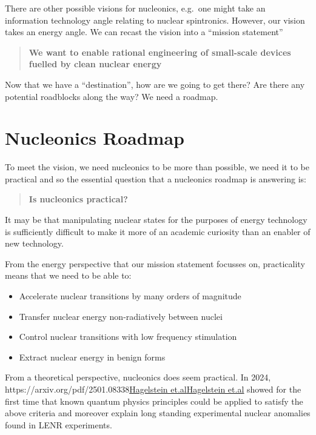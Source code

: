 \documentclass[
]{article}
\let\oldhref\href
\renewcommand{\href}[2]{\ifx#1\urlprefix\oldhref{#1}{#2}\else\uline{\oldhref{#1}{#2}}\fi}
\renewcommand{\[}{\begin{equation}}
\renewcommand{\]}{\end{equation}}
\providecommand{\tightlist}{%
  \setlength{\itemsep}{0pt}\setlength{\parskip}{0pt}}
\begin{document}
There are other possible visions for nucleonics, e.g.~one might take an
information technology angle relating to nuclear spintronics. However,
our vision takes an energy angle. We can recast the vision into a
``mission statement''

\begin{quote}
\textbf{We want to enable rational engineering of small-scale devices
fuelled by clean nuclear energy}
\end{quote}

Now that we have a ``destination'', how are we going to get there? Are
there any potential roadblocks along the way? We need a roadmap.

\section{Nucleonics Roadmap}\label{nucleonics-roadmap}

To meet the vision, we need nucleonics to be more than possible, we need
it to be practical and so the essential question that a nucleonics
roadmap is answering is:

\begin{quote}
\textbf{Is nucleonics practical?}
\end{quote}

It may be that manipulating nuclear states for the purposes of energy
technology is sufficiently difficult to make it more of an academic
curiosity than an enabler of new technology.

From the energy perspective that our mission statement focusses on,
practicality means that we need to be able to:

\begin{itemize}
\tightlist
\item
  Accelerate nuclear transitions by many orders of magnitude
\item
  Transfer nuclear energy non-radiatively between nuclei
\item
  Control nuclear transitions with low frequency stimulation
\item
  Extract nuclear energy in benign forms
\end{itemize}

From a theoretical perspective, nucleonics does seem practical. In 2024,
\href{https://arxiv.org/pdf/2501.08338}{Hagelstein et.al} showed for the
first time that known quantum physics principles could be applied to
satisfy the above criteria and moreover explain long standing
experimental nuclear anomalies found in LENR experiments.
\end{document}
